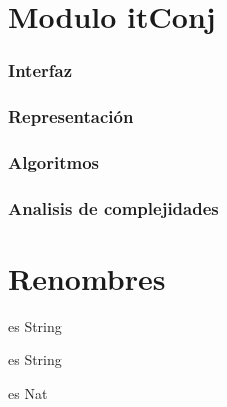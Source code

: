 \documentclass[10pt, a4paper]{article}
\begin{document}
\newpage
\section{Modulo itConj}
\subsubsection{Interfaz}

\subsubsection{Representaci\'on}

\subsubsection{Algoritmos}

\subsubsection{Analisis de complejidades}


\newpage
\section{Renombres}
\begin{tad}{} es String
\end{tad}


\begin{tad}{} es String
\end{tad}

\begin{tad}{} es Nat
\end{tad}
\end{document}
